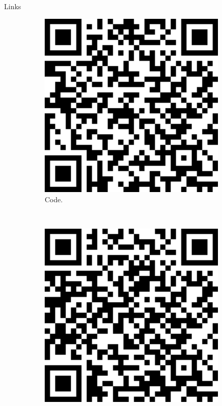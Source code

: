 \documentclass[20pt]{beamer}
\begin{document}
\begin{frame}[fragile,t]
\begin{columns}[t]
\begin{column}{0.33\linewidth}
\begin{block}{Links}
\begin{figure}
\begin{subfigure}[b]{0.2\textwidth}
\includegraphics[width=0.99\textwidth]{images/qrcode_prioritizedeforestationhotspots.png} \\
\centering
{Code.}
    \end{subfigure}
    ~
    \begin{subfigure}[b]{0.2\textwidth}
\includegraphics[width=0.99\textwidth]{images/qr_poster.png} \\

\end{subfigure}
\end{figure}
\end{block}
\end{column}
\end{columns}
\end{frame}
\end{document}
